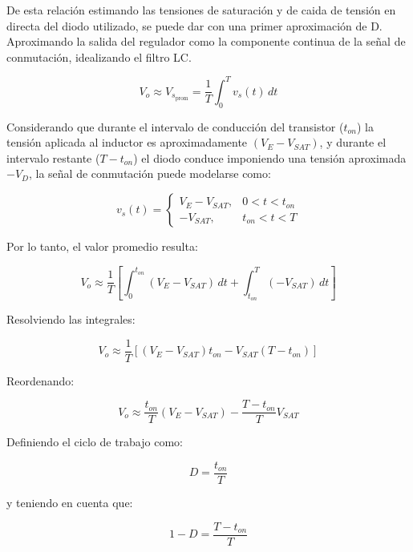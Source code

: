 \documentclass[]{article}
\begin{document}
	
	De esta relación estimando las tensiones de saturación y de caida de tensión en directa del diodo utilizado, se puede dar con una primer aproximación de D. Aproximando la salida del regulador como la componente continua de la señal de conmutación, idealizando el filtro LC.
	
	
	\begin{equation}
		V_o \approx V_{s_{\text{prom}}}
		=
		\frac{1}{T}\int_0^T v_s(t)\,dt
	\end{equation}
	
	Considerando que durante el intervalo de conducción del transistor ($t_{on}$) la tensión aplicada al inductor es aproximadamente $(V_E - V_{SAT})$, y durante el intervalo restante ($T-t_{on}$) el diodo conduce imponiendo una tensión aproximada $-V_D$, la señal de conmutación puede modelarse como:
	
	\begin{equation}
		v_s(t)=
		\begin{cases}
			V_E - V_{SAT}, & 0<t<t_{on} \\
			-V_{SAT}, & t_{on}<t<T
		\end{cases}
	\end{equation}
	
	Por lo tanto, el valor promedio resulta:
	
	\begin{equation}
		V_o \approx
		\frac{1}{T}
		\left[
		\int_0^{t_{on}} (V_E - V_{SAT})\,dt
		+
		\int_{t_{on}}^T (-V_{SAT})\,dt
		\right]
	\end{equation}
	
	Resolviendo las integrales:
	
	\begin{equation}
		V_o \approx
		\frac{1}{T}
		\left[
		(V_E - V_{SAT})t_{on}
		-
		V_{SAT}(T-t_{on})
		\right]
	\end{equation}
	
	Reordenando:
	
	\begin{equation}
		V_o \approx
		\frac{t_{on}}{T}(V_E - V_{SAT})
		-
		\frac{T-t_{on}}{T}V_{SAT}
	\end{equation}
	
	Definiendo el ciclo de trabajo como:
	
	\begin{equation}
		D = \frac{t_{on}}{T}
	\end{equation}
	
	y teniendo en cuenta que:
	
	\begin{equation}
		1-D = \frac{T-t_{on}}{T}
	\end{equation}
	
\end{document}
